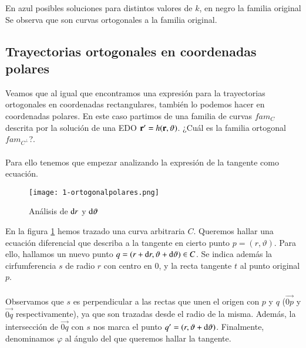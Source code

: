 \begin{eg}
\begin{center}
\hfill \break
        \vspace{1pt}
        En azul posibles soluciones para distintos valores de $k$, en negro la familia original\\
        Se observa que son curvas ortogonales a la familia original.
    \end{center}
\end{eg}

\subsection{Trayectorias ortogonales en coordenadas polares}
Veamos que al igual que encontramos una expresión para la trayectorias ortogonales en coordenadas rectangulares, también lo podemos hacer en coordenadas polares. En este caso partimos de una familia de curvas $fam_C$ descrita por la solución de una EDO $\mathbf{r'} = h(\mathbf{r}, \vartheta)$. ¿Cuál es la familia ortogonal $fam_{C^\perp}$?.\\\\
Para ello tenemos que empezar analizando la expresión de la tangente como ecuación.

\begin{wrapfigure}{l}{.6\textwidth}
  \begin{center}
    \texttt{[image: 1-ortogonalpolares.png]}
  \end{center}
  \caption{Análisis de $\mathrm{d} r$ y $\mathrm{d} \vartheta$}\label{img:1-polort}
\end{wrapfigure}
En la figura \ref{img:1-polort} hemos trazado una curva arbitraria $C$. Queremos hallar una ecuación diferencial que describa a la tangente en cierto punto $p = (r,\vartheta)$. Para ello, hallamos un nuevo punto $q = (r + \mathrm{d} r, \vartheta +\mathrm{d} \vartheta) \in C$. Se indica además la cirfumferencia $s$ de radio $r$ con centro en $0$, y la recta tangente $t$ al punto original $p$.\\\\
Observamos que $s$ es perpendicular a las rectas que unen el origen con $p$ y $q$ ($\vec{0p}$ y $\vec{0q}$ respectivamente), ya que son trazadas desde el radio de la misma. Además, la intersección de $\vec{0q}$ con $s$ nos marca el punto $q' = (r, \vartheta +\mathrm{d} \vartheta)$. Finalmente, denominamos $\varphi$ al ángulo del que queremos hallar la tangente.

